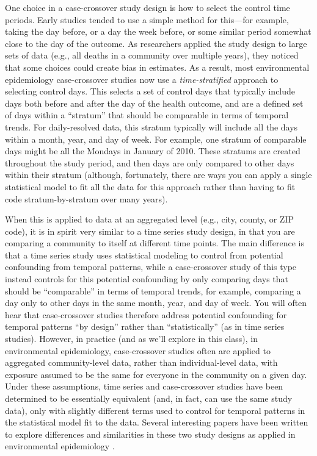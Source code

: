 \documentclass[
]{book}
\begin{document}
One choice in a case-crossover study design is how to select the control time
periods. Early studies tended to use a simple method for this---for example, taking
the day before, or a day the week before, or some similar period somewhat
close to the day of the outcome. As researchers applied the study design to large
sets of data (e.g., all deaths in a community over multiple years), they noticed
that some choices could create bias in estimates. As a result, most environmental
epidemiology case-crossover studies now use a \emph{time-stratified} approach to selecting
control days. This selects a set of control days that typically include days both
before and after the day of the health outcome, and are a defined set of days
within a ``stratum'' that should be comparable in terms of temporal trends. For
daily-resolved data, this stratum typically will include all the days within
a month, year, and day of week. For example, one stratum of comparable days might
be all the Mondays in January of 2010. These stratums are created throughout the
study period, and then days are only compared to other days within their stratum
(although, fortunately, there are ways you can apply a single statistical model
to fit all the data for this approach rather than having to fit code
stratum-by-stratum over many years).

When this is applied to data at an aggregated level (e.g., city, county, or ZIP
code), it is in spirit very similar to a time series study design, in that you
are comparing a community to itself at different time points. The main
difference is that a time series study uses statistical modeling to control from
potential confounding from temporal patterns, while a case-crossover study of
this type instead controls for this potential confounding by only comparing days
that should be ``comparable'' in terms of temporal trends, for example, comparing
a day only to other days in the same month, year, and day of week. You will
often hear that case-crossover studies therefore address potential confounding
for temporal patterns ``by design'' rather than ``statistically'' (as in time series
studies). However, in practice (and as we'll explore in this class), in
environmental epidemiology, case-crossover studies often are applied to
aggregated community-level data, rather than individual-level data, with exposure
assumed to be the same for everyone in the community on a given day. Under these
assumptions, time series and case-crossover studies have been determined to
be essentially equivalent (and, in fact, can use the same study data), only with
slightly different terms used to control for temporal patterns in the statistical
model fit to the data. Several interesting papers have been written to explore
differences and similarities in these two study designs as applied in environmental
epidemiology \citep{basu2005temperature, armstrong2014conditional, lu2007equivalence}.
\end{document}
